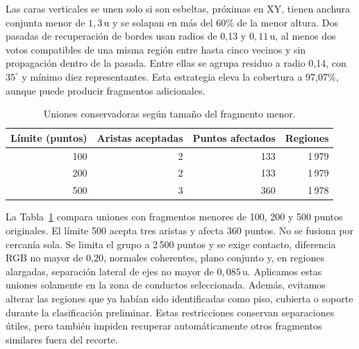 \documentclass[journal,onecolumn]{IEEEtran}
\newcommand{\ucoord}{\,\mathrm{u}}
\begin{document}
Las caras verticales se unen solo si son esbeltas, próximas en XY, tienen anchura conjunta menor de $1,3\ucoord$ y se solapan en más del 60\% de la menor altura. Dos pasadas de recuperación de bordes usan radios de 0,13 y $0,11\ucoord$, al menos dos votos compatibles de una misma región entre hasta cinco vecinos y sin propagación dentro de la pasada. Entre ellas se agrupa residuo a radio 0,14, con $35^\circ$ y mínimo diez representantes. Esta estrategia eleva la cobertura a 97,07\%, aunque puede producir fragmentos adicionales.
\begin{table}[H]
\centering\caption{Uniones conservadoras según tamaño del fragmento menor.}\label{tab:fragmentos}
\small
\begin{tabular}{rrrr}\toprule
Límite (puntos) & Aristas aceptadas & Puntos afectados & Regiones\\\midrule
100 & 2 & 133 & 1\,979\\
200 & 2 & 133 & 1\,979\\
500 & 3 & 360 & 1\,978\\
\bottomrule\end{tabular}
\end{table}

La Tabla~\ref{tab:fragmentos} compara uniones con fragmentos menores de 100, 200 y 500 puntos originales. El límite 500 acepta tres aristas y afecta 360 puntos. No se fusiona por cercanía sola. Se limita el grupo a 2\,500 puntos y se exige contacto, diferencia RGB no mayor de 0,20, normales coherentes, plano conjunto y, en regiones alargadas, separación lateral de ejes no mayor de $0,085\ucoord$. Aplicamos estas uniones solamente en la zona de conductos seleccionada. Además, evitamos alterar las regiones que ya habían sido identificadas como piso, cubierta o soporte durante la clasificación preliminar. Estas restricciones conservan separaciones útiles, pero también impiden recuperar automáticamente otros fragmentos similares fuera del recorte.
\end{document}
